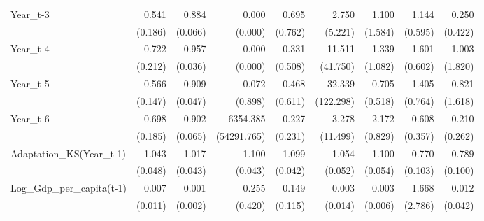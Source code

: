 \begin{table}[htbp]
\begin{tabular}{l*{8}{D{.}{.}{-1}}}
Year\_t-3    &       0.541\sym{*}  &       0.884\sym{*}  &       0.000         &       0.695         &       2.750         &       1.100         &       1.144         &       0.250         \\
            &     (0.186)         &     (0.066)         &     (0.000)         &     (0.762)         &     (5.221)         &     (1.584)         &     (0.595)         &     (0.422)         \\
Year\_t-4    &       0.722         &       0.957         &       0.000         &       0.331         &      11.511         &       1.339         &       1.601         &       1.003         \\
            &     (0.212)         &     (0.036)         &     (0.000)         &     (0.508)         &    (41.750)         &     (1.082)         &     (0.602)         &     (1.820)         \\
Year\_t-5    &       0.566\sym{**} &       0.909\sym{*}  &       0.072         &       0.468         &      32.339         &       0.705         &       1.405         &       0.821         \\
            &     (0.147)         &     (0.047)         &     (0.898)         &     (0.611)         &   (122.298)         &     (0.518)         &     (0.764)         &     (1.618)         \\
Year\_t-6    &       0.698         &       0.902         &    6354.385         &       0.227\sym{\%}  &       3.278         &       2.172\sym{**} &       0.608         &       0.210         \\
            &     (0.185)         &     (0.065)         & (54291.765)         &     (0.231)         &    (11.499)         &     (0.829)         &     (0.357)         &     (0.262)         \\
Adaptation\_KS(Year\_t-1)&       1.043         &       1.017         &       1.100\sym{**} &       1.099\sym{**} &       1.054         &       1.100\sym{*}  &       0.770\sym{*}  &       0.789\sym{*}  \\
            &     (0.048)         &     (0.043)         &     (0.043)         &     (0.042)         &     (0.052)         &     (0.054)         &     (0.103)         &     (0.100)         \\
Log\_Gdp\_per\_capita(t-1)&       0.007\sym{***}&       0.001\sym{***}&       0.255         &       0.149\sym{**} &       0.003         &       0.003\sym{***}&       1.668         &       0.012         \\
            &     (0.011)         &     (0.002)         &     (0.420)         &     (0.115)         &     (0.014)         &     (0.006)         &     (2.786)         &     (0.042)         \\

\end{tabular}
\end{table}
